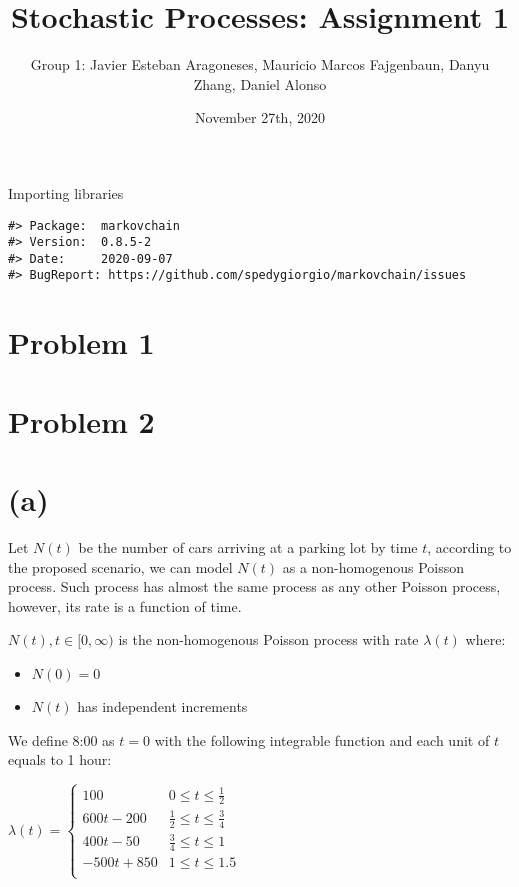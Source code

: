 \documentclass[]{article}
\title{Stochastic Processes: Assignment 1}
\author{Group 1: Javier Esteban Aragoneses, Mauricio Marcos Fajgenbaun, Danyu
Zhang, Daniel Alonso}
\date{November 27th, 2020}
\providecommand{\tightlist}{%
  \setlength{\itemsep}{0pt}\setlength{\parskip}{0pt}}
\begin{document}
\maketitle

Importing libraries

\begin{verbatim}
#> Package:  markovchain
#> Version:  0.8.5-2
#> Date:     2020-09-07
#> BugReport: https://github.com/spedygiorgio/markovchain/issues
\end{verbatim}

\hypertarget{problem-1}{%
\section{Problem 1}\label{problem-1}}

\hypertarget{problem-2}{%
\section{Problem 2}\label{problem-2}}

\hypertarget{a}{%
\section{(a)}\label{a}}

Let \textbf{\(N(t)\)} be the number of cars arriving at a parking lot by
time \textbf{\(t\)}, according to the proposed scenario, we can model
\textbf{\(N(t)\)} as a non-homogenous Poisson process. Such process has
almost the same process as any other Poisson process, however, its rate
is a function of time.

\(N(t), t \in [0, \infty)\) is the non-homogenous Poisson process with
rate \(\lambda (t)\) where:

\begin{itemize}
\tightlist
\item
  \(N(0) = 0\)
\item
  \(N(t)\) has independent increments
\end{itemize}

We define 8:00 as \(t=0\) with the following integrable function and
each unit of \(t\) equals to 1 hour:

\(\lambda (t) = \begin{cases} 100 & 0 \leq t \leq \frac{1}{2} \\ 600t - 200 & \frac{1}{2} \leq t \leq \frac{3}{4} \\ 400t - 50 & \frac{3}{4} \leq t \leq 1 \\ -500t + 850 & 1 \leq t \leq 1.5 \\ \end{cases}\)
\end{document}
